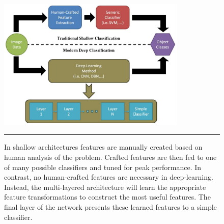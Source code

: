 \begin{figure}[htbp]
	\centering
		\includegraphics[width = 0.8\textwidth]{./Figures/deep_vs_classic_machine_leanring_sparse_coral_classification.jpg}
		\rule{35em}{0.5pt}
	\caption[Shallow vs. Deep Learning]{In shallow architectures features are manually created based on human analysis of the problem. Crafted features are then fed to one of many possible classifiers and tuned for peak performance. In contrast, no human-crafted features are necessary in deep-learning. Instead, the multi-layered architecture will learn the appropriate feature transformations to construct the most useful features. The final layer of the network presents these learned features to a simple classifier.}
	\label{fig:deep_vs_classic_ml}
\end{figure}

